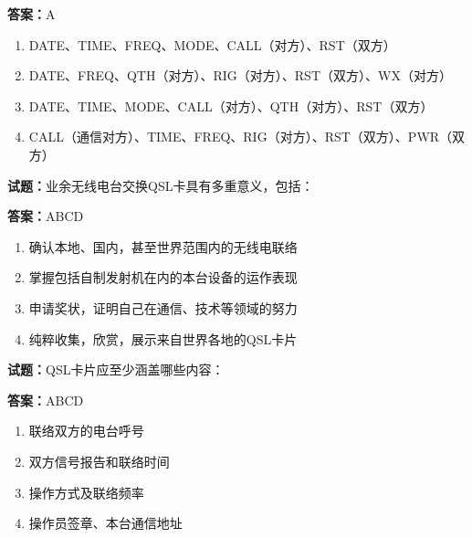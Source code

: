 \documentclass{ctexbook}
\begin{document}
\textbf{答案：}A 

\begin{enumerate}[leftmargin=3em]
  \item DATE、TIME、FREQ、MODE、CALL（对方）、RST（双方） 

  \item DATE、FREQ、QTH（对方）、RIG（对方）、RST（双方）、WX（对方） 

  \item DATE、TIME、MODE、CALL（对方）、QTH（对方）、RST（双方） 

  \item CALL（通信对方）、TIME、FREQ、RIG（对方）、RST（双方）、PWR（双方） 

\end{enumerate}





\vspace{1em}

\textbf{试题：}业余无线电台交换QSL卡具有多重意义，包括： 

\textbf{答案：}ABCD 

\begin{enumerate}[leftmargin=3em]
  \item 确认本地、国内，甚至世界范围内的无线电联络 

  \item 掌握包括自制发射机在内的本台设备的运作表现 

  \item 申请奖状，证明自己在通信、技术等领域的努力 

  \item 纯粹收集，欣赏，展示来自世界各地的QSL卡片 

\end{enumerate}





\vspace{1em}

\textbf{试题：}QSL卡片应至少涵盖哪些内容： 

\textbf{答案：}ABCD 


\begin{enumerate}[leftmargin=3em]
  \item 联络双方的电台呼号 

  \item 双方信号报告和联络时间 

  \item 操作方式及联络频率 

  \item 操作员签章、本台通信地址 

\end{enumerate}
\end{document}
